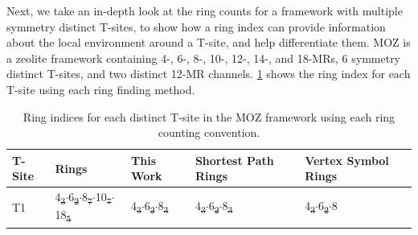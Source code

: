 \documentclass[preprint,numrefs,noinfo,sort&compress]{elsarticle}
\providecommand{\DIFadd}[1]{{\protect\color{blue}\uwave{#1}}} %
\providecommand{\DIFdel}[1]{{\protect\color{red}\sout{#1}}}                      %
\providecommand{\DIFaddFL}[1]{\DIFadd{#1}} %
\providecommand{\DIFdelFL}[1]{\DIFdel{#1}} %
\providecommand{\DIFaddbeginFL}{} %
\providecommand{\DIFaddendFL}{} %
\providecommand{\DIFdelbeginFL}{} %
\providecommand{\DIFdelendFL}{} %
\newcommand{\DIFscaledelfig}{0.5}
\newlength{\DIFdelgraphicswidth} %
\newlength{\DIFdelgraphicsheight} %
\newcommand{\DIFaddincludegraphics}[2][]{{\color{blue}\fbox{\DIFOincludegraphics[#1]{#2}}}} %
\newcommand{\DIFdelincludegraphics}[2][]{%
\sbox{\DIFdelgraphicsbox}{\DIFOincludegraphics[#1]{#2}}%
\settoboxwidth{\DIFdelgraphicswidth}{\DIFdelgraphicsbox} %
\settoboxtotalheight{\DIFdelgraphicsheight}{\DIFdelgraphicsbox} %
\scalebox{\DIFscaledelfig}{%
\parbox[b]{\DIFdelgraphicswidth}{\usebox{\DIFdelgraphicsbox}\\[-\baselineskip] \rule{\DIFdelgraphicswidth}{0em}}\llap{\resizebox{\DIFdelgraphicswidth}{\DIFdelgraphicsheight}{%
\setlength{\unitlength}{\DIFdelgraphicswidth}%
\begin{picture}(1,1)%
\thicklines\linethickness{2pt} %
{\color[rgb]{1,0,0}\put(0,0){\framebox(1,1){}}}%
{\color[rgb]{1,0,0}\put(0,0){\line( 1,1){1}}}%
{\color[rgb]{1,0,0}\put(0,1){\line(1,-1){1}}}%
\end{picture}%
}\hspace*{3pt}}} %
} %
\DeclareRobustCommand{\DIFaddbeginFL}{\DIFOaddbeginFL \let\includegraphics\DIFaddincludegraphics} %
\DeclareRobustCommand{\DIFaddendFL}{\DIFOaddendFL \let\includegraphics\DIFOincludegraphics} %
\DeclareRobustCommand{\DIFdelbeginFL}{\DIFOdelbeginFL \let\includegraphics\DIFdelincludegraphics} %
\DeclareRobustCommand{\DIFdelendFL}{\DIFOaddendFL \let\includegraphics\DIFOincludegraphics} %
\begin{document}
Next, we take an in-depth look at the ring counts for a framework with multiple symmetry distinct T-sites, to show how a ring index can provide information about the local environment around a T-site, and help differentiate them. MOZ is a zeolite framework containing 4-, 6-, 8-, 10-, 12-, 14-, and 18-MRs, 6 symmetry distinct T-sites, and two distinct 12-MR channels. \cref{tab:moz} shows the ring index for each T-site using each ring finding method.

\begin{table}
\centering
\begin{threeparttable}
\caption{Ring indices for each distinct T-site in the MOZ framework using each ring counting convention. \label{tab:moz}}
{\scriptsize
\begin{tabular}{lllll}
\hline
T-Site & Rings & This Work & Shortest Path Rings & Vertex Symbol Rings\\
\hline
T1 & 4\DIFdelbeginFL \DIFdelFL{\textsubscript{3}\(\cdot\)}\DIFdelendFL \DIFaddbeginFL \DIFaddFL{\(_{\text{3}} \cdot\)}\DIFaddendFL 6\DIFdelbeginFL \DIFdelFL{\textsubscript{2}\(\cdot\)}\DIFdelendFL \DIFaddbeginFL \DIFaddFL{\(_{\text{2}} \cdot\)}\DIFaddendFL 8\DIFdelbeginFL \DIFdelFL{\textsubscript{7}\(\cdot\)}\DIFdelendFL \DIFaddbeginFL \DIFaddFL{\(_{\text{7}} \cdot\)}\DIFaddendFL 10\DIFdelbeginFL \DIFdelFL{\textsubscript{7}\(\cdot\)}\DIFdelendFL \DIFaddbeginFL \DIFaddFL{\(_{\text{7}} \cdot\)}\DIFaddendFL 18\DIFdelbeginFL \DIFdelFL{\textsubscript{5} }\DIFdelendFL \DIFaddbeginFL \DIFaddFL{\(_{\text{5}}\) }\DIFaddendFL & 4\DIFdelbeginFL \DIFdelFL{\textsubscript{3}\(\cdot\)}\DIFdelendFL \DIFaddbeginFL \DIFaddFL{\(_{\text{3}} \cdot\)}\DIFaddendFL 6\DIFdelbeginFL \DIFdelFL{\textsubscript{2}\(\cdot\)}\DIFdelendFL \DIFaddbeginFL \DIFaddFL{\(_{\text{2}} \cdot\)}\DIFaddendFL 8\DIFdelbeginFL \DIFdelFL{\textsubscript{3} }\DIFdelendFL \DIFaddbeginFL \DIFaddFL{\(_{\text{3}}\) }\DIFaddendFL & 4\DIFdelbeginFL \DIFdelFL{\textsubscript{3}\(\cdot\)}\DIFdelendFL \DIFaddbeginFL \DIFaddFL{\(_{\text{3}} \cdot\)}\DIFaddendFL 6\DIFdelbeginFL \DIFdelFL{\textsubscript{2}\(\cdot\)}\DIFdelendFL \DIFaddbeginFL \DIFaddFL{\(_{\text{2}} \cdot\)}\DIFaddendFL 8\DIFdelbeginFL \DIFdelFL{\textsubscript{3} }\DIFdelendFL \DIFaddbeginFL \DIFaddFL{\(_{\text{3}}\) }\DIFaddendFL & 4\DIFdelbeginFL \DIFdelFL{\textsubscript{3}\(\cdot\)}\DIFdelendFL \DIFaddbeginFL \DIFaddFL{\(_{\text{3}} \cdot\)}\DIFaddendFL 6\DIFdelbeginFL \DIFdelFL{\textsubscript{2}\(\cdot\)}\DIFdelendFL \DIFaddbeginFL \DIFaddFL{\(_{\text{2}} \cdot\)}\DIFaddendFL 8\\

\end{tabular}}
\end{threeparttable}
\end{table}
\end{document}
